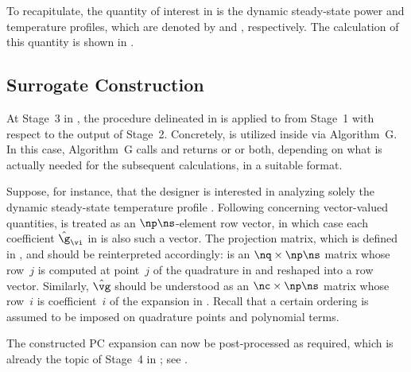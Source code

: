 To recapitulate, the quantity of interest \g in  is the
dynamic steady-state power and temperature profiles, which are denoted by \mp
and \mq, respectively. The calculation of this quantity is shown in
.

\subsection{Surrogate Construction}

At Stage~3 in , the procedure delineated in
 is applied to
 from Stage~1 with respect to the
output of Stage~2. Concretely,  is
utilized inside  via Algorithm~G. In this case,
Algorithm~G calls  and returns \mp
or \mq or both, depending on what is actually needed for the subsequent
calculations, in a suitable format.

Suppose, for instance, that the designer is interested in analyzing solely the
dynamic steady-state temperature profile \mq. Following
 concerning vector-valued quantities, \g is
treated as an $\np \ns$-element row vector, in which case each coefficient
$\hat{\g}_{\vi}$ in  is also such a vector. The projection
matrix, which is defined in , and
 should be reinterpreted accordingly: \vg is an $\nq
\times \np \ns$ matrix whose row~$j$ is \mq computed at point~$j$ of the
quadrature in  and reshaped into a row vector.
Similarly, $\hat{\vg}$ should be understood as an $\nc \times \np \ns$ matrix
whose row~$i$ is coefficient~$i$ of the expansion in .
Recall that a certain ordering is assumed to be imposed on quadrature points and
polynomial terms.

The constructed \ac{PC} expansion can now be post-processed as required, which
is already the topic of Stage~4 in ; see
.
